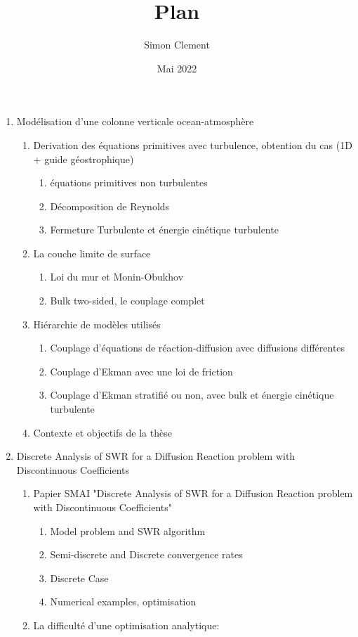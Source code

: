 \documentclass{article}
\title{Plan}
\author{Simon Clement}
\date{Mai 2022}
\begin{document}
\begin{enumerate}
\item Modélisation d'une colonne verticale ocean-atmosphère
\begin{enumerate}
	\item Derivation des équations primitives avec turbulence,
		obtention du cas (1D + guide géostrophique)
		\begin{enumerate}
			\item équations primitives non turbulentes
			\item Décomposition de Reynolds
			\item Fermeture Turbulente et énergie cinétique turbulente
		\end{enumerate}
	\item La couche limite de surface
		\begin{enumerate}
			\item Loi du mur et Monin-Obukhov
			\item Bulk two-sided, le couplage complet
		\end{enumerate}
	\item Hiérarchie de modèles utilisés
		\begin{enumerate}
			\item Couplage d'équations de
				réaction-diffusion avec
				diffusions différentes
			\item Couplage d'Ekman avec une loi de friction
			\item Couplage d'Ekman stratifié ou non,
				avec bulk et énergie cinétique turbulente
		\end{enumerate}
	\item Contexte et objectifs de la thèse
\end{enumerate}
\item Discrete Analysis of SWR for a Diffusion Reaction problem
	with Discontinuous Coefficients
		\begin{enumerate}
		\item Papier SMAI "Discrete Analysis of SWR for a
			Diffusion Reaction problem with
				Discontinuous Coefficients"
			\begin{enumerate}
				\item Model problem and SWR algorithm
				\item Semi-discrete and Discrete convergence rates
				\item Discrete Case
				\item Numerical examples, optimisation
			\end{enumerate}
		\item La difficulté d'une optimisation analytique:

\end{enumerate}
\end{enumerate}
\end{document}
